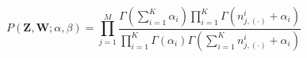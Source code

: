 \documentclass{article}
\title{}
\begin{document}
\maketitle
\begin{equation}
P(\bm{Z},\bm{W};\alpha,\beta) = \prod_{j=1}^{M}\frac{\Gamma(\sum_{i=1}^{K}\alpha_i)\prod_{i=1}^{K}\Gamma(n_{j,(\cdot)}^i + \alpha_i)}{\prod_{i=1}^{K}\Gamma(\alpha_i)\Gamma(\sum_{i=1}^{K}n_{j,(\cdot)}^i+\alpha_i)} 
\end{equation}
\end{document}
